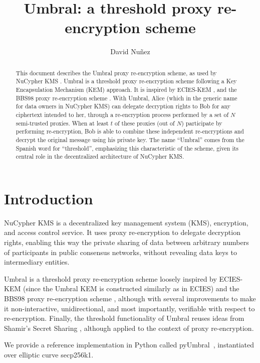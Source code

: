 \documentclass{amsart}
\title{Umbral: a threshold proxy re-encryption scheme}
\author{David Nuñez}
\date{} %
\newcommand{\pyumbral}{\textsf{pyUmbral}}
\newcommand{\secp}{\textsf{secp256k1}}
\begin{document}
\maketitle

\begin{abstract}
This document describes the Umbral proxy re-encryption scheme, as used by NuCypher KMS \cite{egorov2017nucypherkms}. 
Umbral is a threshold proxy re-encryption scheme following a Key Encapsulation Mechanism (KEM) approach. It is inspired by ECIES-KEM \cite{ansi-x9.63}, and the BBS98 proxy re-encryption scheme \cite{blaze1998divertible}. 
With Umbral, Alice (which in the generic name for data owners in NuCypher KMS) can delegate decryption rights to Bob for any ciphertext intended to her, through a re-encryption process performed by a set of $N$ semi-trusted proxies. When at least $t$ of these proxies (out of $N$) participate by performing re-encryption, Bob is able to combine these independent re-encryptions and decrypt the original message using his private key. 
The name ``Umbral'' comes from the Spanish word for ``threshold'', emphasizing this characteristic of the scheme, given its central role in the decentralized architecture of NuCypher KMS. 
\end{abstract}



\section{Introduction}

NuCypher KMS \cite{egorov2017nucypherkms} is a decentralized key management system (KMS), encryption, and access control service. 
It uses proxy re-encryption to delegate decryption rights, enabling this way the private sharing of data between arbitrary numbers of participants in public consensus networks, without revealing data keys to intermediary entities. 

Umbral is a threshold proxy re-encryption scheme loosely inspired by ECIES-KEM \cite{ansi-x9.63} (since the Umbral KEM is constructed similarly as in ECIES) and the BBS98 proxy re-encryption scheme \cite{blaze1998divertible}, although with several improvements to make it non-interactive, unidirectional, and most importantly, verifiable with respect to re-encryption. Finally, the threshold functionality of Umbral reuses ideas from Shamir's Secret Sharing \cite{shamir1979share}, although applied to the context of proxy re-encryption. 

We provide a reference implementation in Python called \pyumbral~\cite{pyumbral}, instantiated over elliptic curve \secp.
\end{document}
